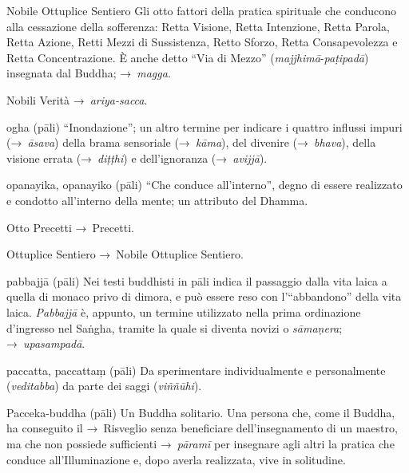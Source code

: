 \begin{glossarydescription}
\item[Nobile Ottuplice Sentiero] \label{glossary-ottuplice} Gli otto fattori della pratica spirituale che
  conducono alla cessazione della sofferenza: Retta Visione, Retta Intenzione,
  Retta Parola, Retta Azione, Retti Mezzi di Sussistenza, Retto Sforzo, Retta
  Consapevolezza e Retta Concentrazione. È anche detto ``Via di Mezzo''
  (\emph{majjhimā}-\emph{paṭipadā}) insegnata dal Buddha; →~\emph{magga}.

\item[Nobili Verità] →~\emph{ariya-sacca}.


\item[ogha] (pāli) ``Inondazione''; un altro termine per indicare i quattro
  influssi impuri (→~\emph{āsava}) della brama sensoriale (→~\emph{kāma}), del
  divenire (→~\emph{bhava}), della visione errata (→~\emph{diṭṭhi}) e
  dell'ignoranza (→~\emph{avijjā}).

\item[opanayika, opanayiko] (pāli) ``Che conduce all'interno'', degno di essere
  realizzato e condotto all'interno della mente; un attributo del Dhamma.

\item[Otto Precetti] →~Precetti.

\item[Ottuplice Sentiero] →~Nobile Ottuplice Sentiero.


\item[pabbajjā] (pāli) Nei testi buddhisti in pāli indica il passaggio dalla
  vita laica a quella di monaco privo di dimora, e può essere reso con
  l'``abbandono'' della vita laica. \emph{Pabbajjā} è, appunto, un termine
  utilizzato nella prima ordinazione d'ingresso nel Saṅgha, tramite la quale si
  diventa novizi o \emph{sāmaṇera}; →~\emph{upasampadā}.

\item[paccatta, paccattaṃ] (pāli) Da sperimentare individualmente e
  personalmente (\emph{veditabba}) da parte dei saggi (\emph{viññūhi}).

\item[Pacceka-buddha] (pāli) Un Buddha solitario. Una persona che, come il
  Buddha, ha conseguito il →~Risveglio senza beneficiare dell'insegnamento di un
  maestro, ma che non possiede sufficienti →~\emph{pāramī} per insegnare agli
  altri la pratica che conduce all'Illuminazione e, dopo averla realizzata, vive
  in solitudine.


\end{glossarydescription}

